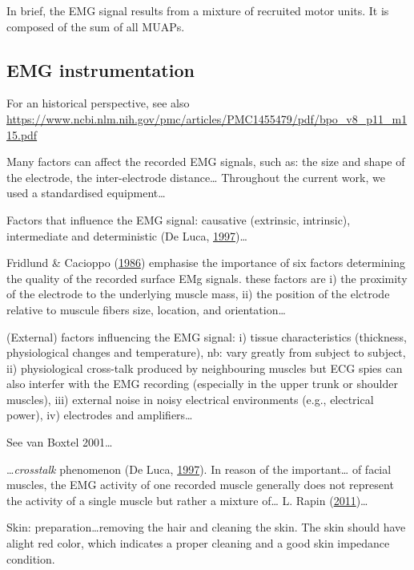 \documentclass[a4paper,12pt,twoside,openright,oldfontcommands]{memoir}
\begin{document}
In brief, the EMG signal results from a mixture of recruited motor
units. It is composed of the sum of all MUAPs.

\subsection{EMG instrumentation}\label{emg-instrumentation}

For an historical perspective, see also
\url{https://www.ncbi.nlm.nih.gov/pmc/articles/PMC1455479/pdf/bpo_v8_p11_m115.pdf}

Many factors can affect the recorded EMG signals, such as: the size and
shape of the electrode, the inter-electrode distance\ldots{} Throughout
the current work, we used a standardised equipment\ldots{}

Factors that influence the EMG signal: causative (extrinsic, intrinsic),
intermediate and deterministic (De Luca,
\protect\hyperlink{ref-de_luca_use_1997}{1997})\ldots{}

Fridlund \& Cacioppo
(\protect\hyperlink{ref-fridlund_guidelines_1986}{1986}) emphasise the
importance of six factors determining the quality of the recorded
surface EMg signals. these factors are i) the proximity of the electrode
to the underlying muscle mass, ii) the position of the elctrode relative
to muscule fibers size, location, and orientation\ldots{}

(External) factors influencing the EMG signal: i) tissue characteristics
(thickness, physiological changes and temperature), nb: vary greatly
from subject to subject, ii) physiological cross-talk produced by
neighbouring muscles but ECG spies can also interfer with the EMG
recording (especially in the upper trunk or shoulder muscles), iii)
external noise in noisy electrical environments (e.g., electrical
power), iv) electrodes and amplifiers\ldots{}

See van Boxtel 2001\ldots{}

\ldots{}\emph{crosstalk} phenomenon (De Luca,
\protect\hyperlink{ref-de_luca_use_1997}{1997}). In reason of the
important\ldots{} of facial muscles, the EMG activity of one recorded
muscle generally does not represent the activity of a single muscle but
rather a mixture of\ldots{} L. Rapin
(\protect\hyperlink{ref-Rapin2011}{2011})\ldots{}

Skin: preparation\ldots{}removing the hair and cleaning the skin. The
skin should have alight red color, which indicates a proper cleaning and
a good skin impedance condition.
\end{document}
